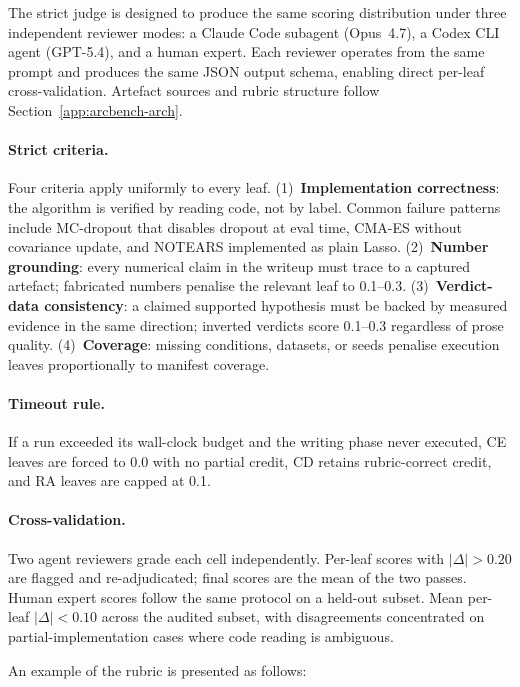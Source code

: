 \documentclass{llmxive}
\begin{document}
The strict judge is designed to produce the same scoring distribution under three independent reviewer modes: a Claude Code subagent (Opus~4.7), a Codex CLI agent (GPT-5.4), and a human expert.
Each reviewer operates from the same prompt and produces the same JSON output schema, enabling direct per-leaf cross-validation.
Artefact sources and rubric structure follow Section~\ref{app:arcbench-arch}.

\paragraph{Strict criteria.}
Four criteria apply uniformly to every leaf.
(1)~\textbf{Implementation correctness}: the algorithm is verified by reading code, not by label.
Common failure patterns include MC-dropout that disables dropout at eval time, CMA-ES without covariance update, and NOTEARS implemented as plain Lasso.
(2)~\textbf{Number grounding}: every numerical claim in the writeup must trace to a captured artefact; fabricated numbers penalise the relevant leaf to 0.1--0.3.
(3)~\textbf{Verdict-data consistency}: a claimed supported hypothesis must be backed by measured evidence in the same direction; inverted verdicts score 0.1--0.3 regardless of prose quality.
(4)~\textbf{Coverage}: missing conditions, datasets, or seeds penalise execution leaves proportionally to manifest coverage.

\paragraph{Timeout rule.}
If a run exceeded its wall-clock budget and the writing phase never executed, CE leaves are forced to 0.0 with no partial credit, CD retains rubric-correct credit, and RA leaves are capped at 0.1.

\paragraph{Cross-validation.}
Two agent reviewers grade each cell independently.
Per-leaf scores with $|\Delta| > 0.20$ are flagged and re-adjudicated; final scores are the mean of the two passes.
Human expert scores follow the same protocol on a held-out subset.
Mean per-leaf $|\Delta| < 0.10$ across the audited subset, with disagreements concentrated on partial-implementation cases where code reading is ambiguous.

An example of the rubric is presented as follows:
\end{document}
